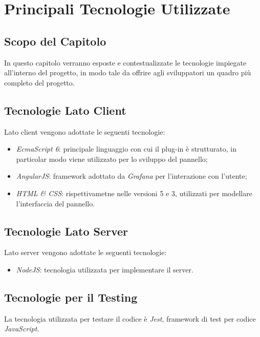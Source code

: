 \section{Principali Tecnologie Utilizzate}\label{tecnologie}
\subsection{Scopo del Capitolo}
In questo capitolo verranno esposte e contestualizzate le tecnologie impiegate all'interno del progetto, in modo tale da offrire agli sviluppatori un quadro più completo del progetto.

\subsection{Tecnologie Lato Client}\label{clientTec}
Lato client vengono adottate le seguenti tecnologie:
\begin{itemize}
	\item \textit{EcmaScript 6}: principale linguaggio con cui il plug-in è strutturato, in particolar modo viene utilizzato per lo sviluppo del pannello;
	\item \textit{AngularJS}: framework adottato da \textit{Grafana} per l'interazione con l'utente;
	\item \textit{HTML \& CSS}: rispettivametne nelle versioni 5 e 3, utilizzati per modellare l'interfaccia del pannello.
\end{itemize}

\subsection{Tecnologie Lato Server}\label{serverTec}
Lato server vengono adottate le seguenti tecnologie:
\begin{itemize}
	\item \textit{NodeJS}: tecnologia utilizzata per implementare il server.
\end{itemize}

\subsection{Tecnologie per il Testing}\label{testTec}
La tecnologia utilizzata per testare il codice è \textit{Jest}, framework di test per codice \textit{JavaScript}.